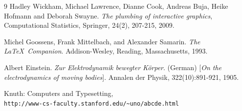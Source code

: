 \documentclass[10pt, legalpaper, twoside]{article}\usepackage[]{graphicx}\usepackage[]{color}
\begin{document}
\begin{thebibliography}{9}
Hadley Wickham,  Michael Lawrence, Dianne Cook, Andreas Buja, Heike Hofmann and Deborah Swayne.
\textit{The plumbing of interactive graphics},
Computational Statistics, Springer,
24(2), 207-215, 2009.


Michel Goossens, Frank Mittelbach, and Alexander Samarin.
\textit{The \LaTeX\ Companion}.
Addison-Wesley, Reading, Massachusetts, 1993.

Albert Einstein. 
\textit{Zur Elektrodynamik bewegter K{\"o}rper}. (German) 
[\textit{On the electrodynamics of moving bodies}]. 
Annalen der Physik, 322(10):891-921, 1905.

Knuth: Computers and Typesetting,
\\\texttt{http://www-cs-faculty.stanford.edu/\~{}uno/abcde.html}
\end{thebibliography}
\end{document}

